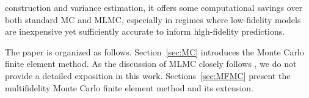 construction and variance estimation, it offers some computational savings over both standard MC and MLMC, especially in regimes where low-fidelity models are inexpensive yet sufficiently accurate to inform high-fidelity predictions.



The paper is organized as follows. Section~\ref{sec:MC} introduces the Monte Carlo finite element method. As the discussion of MLMC closely follows \cite{ElLiSa:2025}, we do not provide a detailed exposition in this work. Sections~\ref{sec:MFMC} present the multifidelity Monte Carlo finite element method and its extension.  


 






